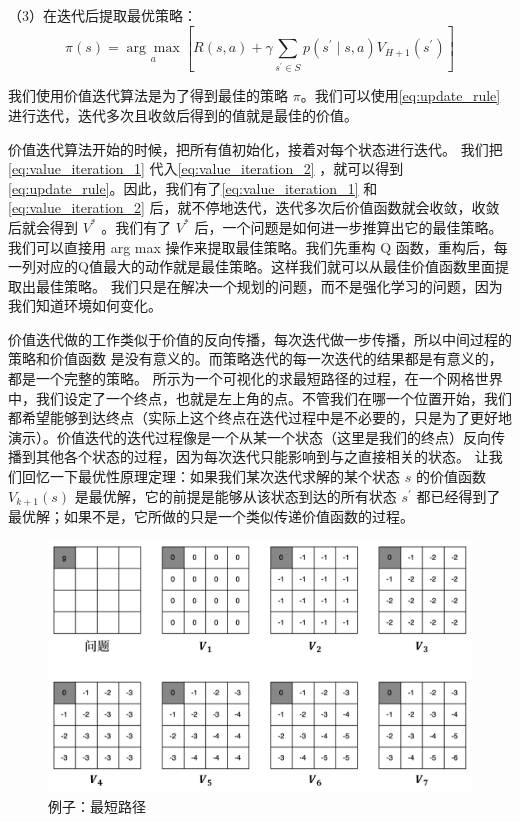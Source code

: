 （3）在迭代后提取最优策略：
  \begin{equation}
    \label{eq:value_iteration_3}
    \pi(s)=\underset{a}{\arg \max } \left[R(s, a)+\gamma \sum_{s^{\prime} \in S} p\left(s^{\prime} \mid s, a\right) V_{H+1}\left(s^{\prime}\right)\right]  
  \end{equation}


 我们使用价值迭代算法是为了得到最佳的策略 $\pi$。我们可以使用\eqref{eq:update_rule} 进行迭代，迭代多次且收敛后得到的值就是最佳的价值。
 
 价值迭代算法开始的时候，把所有值初始化，接着对每个状态进行迭代。
 我们把\eqref{eq:value_iteration_1} 代入\eqref{eq:value_iteration_2} ，就可以得到\eqref{eq:update_rule}。因此，我们有了\eqref{eq:value_iteration_1} 和\eqref{eq:value_iteration_2} 后，就不停地迭代，迭代多次后价值函数就会收敛，收敛后就会得到 $V^*$ 。我们有了 $V^*$ 后，一个问题是如何进一步推算出它的最佳策略。
 我们可以直接用 arg max 操作来提取最佳策略。我们先重构 Q 函数，重构后，每一列对应的Q值最大的动作就是最佳策略。这样我们就可以从最佳价值函数里面提取出最佳策略。
 我们只是在解决一个规划的问题，而不是强化学习的问题，因为我们知道环境如何变化。

价值迭代做的工作类似于价值的反向传播，每次迭代做一步传播，所以中间过程的策略和价值函数 是没有意义的。而策略迭代的每一次迭代的结果都是有意义的，都是一个完整的策略。
 所示为一个可视化的求最短路径的过程，在一个网格世界中，我们设定了一个终点，也就是左上角的点。不管我们在哪一个位置开始，我们都希望能够到达终点（实际上这个终点在迭代过程中是不必要的，只是为了更好地演示）。价值迭代的迭代过程像是一个从某一个状态（这里是我们的终点）反向传播到其他各个状态的过程，因为每次迭代只能影响到与之直接相关的状态。
 让我们回忆一下最优性原理定理：如果我们某次迭代求解的某个状态 $s$ 的价值函数 $V_{k+1}(s)$ 是最优解，它的前提是能够从该状态到达的所有状态 $s^{\prime}$ 都已经得到了最优解；如果不是，它所做的只是一个类似传递价值函数的过程。

\begin{figure}[hbt]
  \centering
  \includegraphics[width=0.5\linewidth]{res/ch2/2.52}
  \caption{例子：最短路径}
  \label{fig:shortest_path}
\end{figure}

